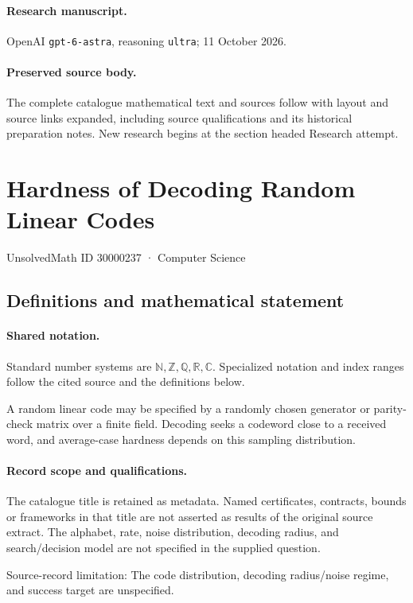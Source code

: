 \documentclass[11pt]{article}
\begin{document}
\paragraph{Research manuscript.} OpenAI \texttt{gpt-6-astra}, reasoning \texttt{ultra}; 11 October 2026.
\paragraph{Preserved source body.} The complete catalogue mathematical text and sources follow with layout and source links expanded, including source qualifications and its historical preparation notes. New research begins at the section headed Research attempt.

\section{Hardness of Decoding Random Linear Codes}\label{30000237}
{\small UnsolvedMath ID 30000237 · Computer Science}
\subsection{Definitions and mathematical statement}

\paragraph{Shared notation.}Standard number systems are $\mathbb N,\mathbb Z,\mathbb Q,\mathbb R,\mathbb C$. Specialized notation and index ranges follow the cited source and the definitions below.


A random linear code may be specified by a randomly chosen generator or parity-check matrix over a finite field. Decoding seeks a codeword close to a received word, and average-case hardness depends on this sampling distribution.
\paragraph{Record scope and qualifications.}
The catalogue title is retained as metadata. Named certificates, contracts, bounds or frameworks in that title are not asserted as results of the original source extract.
The alphabet, rate, noise distribution, decoding radius, and search/decision model are not specified in the supplied question.

Source-record limitation: The code distribution, decoding radius/noise regime, and success target are unspecified.
\end{document}
